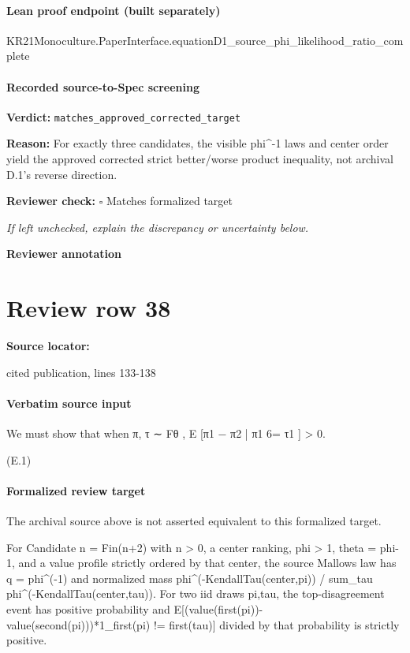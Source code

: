 \documentclass[10pt]{article}
\newcommand{\reviewerbox}{%
  \par\noindent\fbox{\parbox{0.96\linewidth}{\rule{0pt}{0.38in}}}\par
}
\newcommand{\reviewmatch}[1]{%
  \par\noindent\textbf{Reviewer check:} $\square$\; #1\par
  \noindent\emph{If left unchecked, explain the discrepancy or uncertainty below.}\par
}
\begin{document}
\paragraph{Lean proof endpoint (built separately)}\begin{ReviewVerbatim}
KR21Monoculture.PaperInterface.equationD1_source_phi_likelihood_ratio_complete
\end{ReviewVerbatim}

\paragraph{Recorded source-to-Spec screening}
\textbf{Verdict:} \texttt{matches\_approved\_corrected\_target}
\\
{\raggedright
\textbf{Reason:} For exactly three candidates, the visible phi\textasciicircum{}-\allowbreak{}1 laws and center order yield the approved corrected strict better/\allowbreak{}worse product inequality, not archival D.\allowbreak{}1's reverse direction.\allowbreak{}
\par}
\reviewmatch{Matches formalized target}
\noindent\textbf{Reviewer annotation}\par
\reviewerbox
\clearpage
\hypertarget{source-claim-c7560a9682e8906d}{}
\section*{Review row 38}
\textbf{Source locator:} {\footnotesize\raggedright cited publication, lines 133-\allowbreak{}138\par}
\paragraph{Verbatim source input}
\begin{ReviewVerbatim}
We must show that when π, τ ∼ Fθ ,
E [π1 − π2 | π1 6= τ1 ] > 0.

(E.1)
\end{ReviewVerbatim}


\paragraph{Formalized review target}
The archival source above is not asserted equivalent to this formalized target.
\begin{ReviewVerbatim}
For Candidate n = Fin(n+2) with n > 0, a center ranking, phi > 1, theta = phi-1, and a value profile strictly ordered by that center, the source Mallows law has q = phi^(-1) and normalized mass phi^(-KendallTau(center,pi)) / sum_tau phi^(-KendallTau(center,tau)). For two iid draws pi,tau, the top-disagreement event has positive probability and E[(value(first(pi))-value(second(pi)))*1_{first(pi) != first(tau)}] divided by that probability is strictly positive.
\end{ReviewVerbatim}
\end{document}
